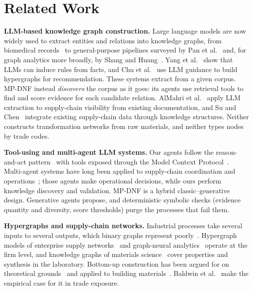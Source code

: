 \section{Related Work}
\label{sec:related}

\textbf{LLM-based knowledge graph construction.}
Large language models are now widely used to extract entities and relations into knowledge graphs, from biomedical records~\cite{arsenyan2024biomedical} to general-purpose pipelines surveyed by Pan et al.~\cite{pan2024unifying} and, for graph analytics more broadly, by Shang and Huang~\cite{shang2025survey}. Yang et al.~\cite{yang2024inductive} show that LLMs can induce rules from facts, and Chu et al.~\cite{chu2024llmhypergraph} use LLM guidance to build hypergraphs for recommendation. These systems extract from a given corpus. MP-DNF instead \emph{discovers} the corpus as it goes: its agents use retrieval tools to find and score evidence for each candidate relation. AlMahri et al.~\cite{almahri2024enhancing} apply LLM extraction to supply-chain visibility from existing documentation, and Su and Chen~\cite{liu2025designing} integrate existing supply-chain data through knowledge structures. Neither constructs transformation networks from raw materials, and neither types nodes by trade codes.

\textbf{Tool-using and multi-agent LLM systems.}
Our agents follow the reason-and-act pattern~\cite{yao2023react} with tools exposed through the Model Context Protocol~\cite{mcp2024}. Multi-agent systems have long been applied to supply-chain coordination and operations~\cite{jaimez2021towards,santos2024implementing,vanderheijden2024multiagent}; those agents make operational decisions, while ours perform knowledge discovery and validation. MP-DNF is a hybrid classic--generative design. Generative agents propose, and deterministic symbolic checks (evidence quantity and diversity, score thresholds) purge the processes that fail them.

\textbf{Hypergraphs and supply-chain networks.}
Industrial processes take several inputs to several outputs, which binary graphs represent poorly~\cite{wolf2016advantages,fatemi2019knowledge,luo2025hypergraphrag}. Hypergraph models of enterprise supply networks~\cite{li2023research,suo2018exploring} and graph-neural analytics~\cite{zhang2024graph} operate at the firm level, and knowledge graphs of materials science~\cite{venugopal2024matkg,mrdjenovich2020propnet} cover properties and synthesis in the laboratory. Bottom-up construction has been argued for on theoretical grounds~\cite{shapiro1998bottom} and applied to building materials~\cite{yang2023integrating}. Baldwin et al.~\cite{baldwin2023hidden} make the empirical case for it in trade exposure.

